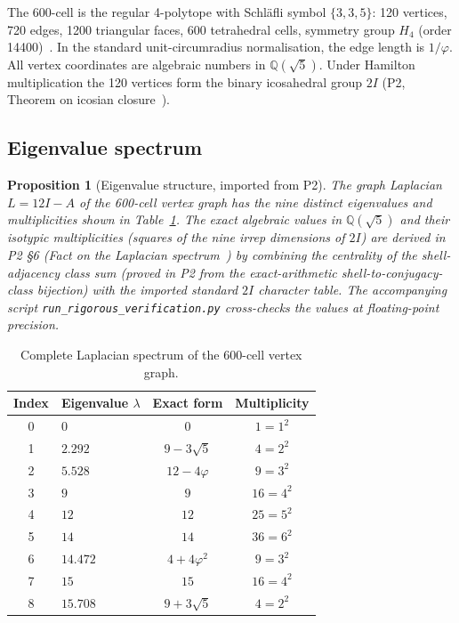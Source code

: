\documentclass[12pt]{article}
\newtheorem{proposition}[theorem]{Proposition}
\newcommand{\phig}{\varphi}
\begin{document}
The 600-cell is the regular 4-polytope with Schl\"afli symbol $\{3,3,5\}$: 120 vertices, 720 edges, 1200 triangular faces, 600 tetrahedral cells, symmetry group $H_4$ (order 14400)~\citep{Coxeter1973}. In the standard unit-circumradius normalisation, the edge length is $1/\phig$. All vertex coordinates are algebraic numbers in $\mathbb{Q}(\sqrt{5})$. Under Hamilton multiplication the 120 vertices form the binary icosahedral group $2I$ (P2, Theorem on icosian closure~\citep{CascadeAlgSubstrate}).

\subsection{Eigenvalue spectrum}

\begin{proposition}[Eigenvalue structure, imported from P2]\label{thm:eigenvalues}
The graph Laplacian $L = 12I - A$ of the 600-cell vertex graph has the nine distinct eigenvalues and multiplicities shown in Table~\ref{tab:spectrum}. The exact algebraic values in $\mathbb{Q}(\sqrt 5)$ and their isotypic multiplicities (squares of the nine irrep dimensions of $2I$) are derived in P2 \S 6 (Fact on the Laplacian spectrum~\citep{CascadeAlgSubstrate}) by combining the centrality of the shell-adjacency class sum (proved in P2 from the exact-arithmetic shell-to-conjugacy-class bijection) with the imported standard $2I$ character table. The accompanying script \texttt{run\_rigorous\_verification.py} cross-checks the values at floating-point precision.
\end{proposition}

\begin{table}[ht]
\centering
\caption{Complete Laplacian spectrum of the 600-cell vertex graph.}
\label{tab:spectrum}
\begin{tabular}{@{}clcc@{}}
\toprule
Index & Eigenvalue $\lambda$ & Exact form & Multiplicity \\
\midrule
0 & $0$ & $0$ & $1 = 1^2$ \\
1 & $2.292$ & $9 - 3\sqrt{5}$ & $4 = 2^2$ \\
2 & $5.528$ & $12 - 4\phig$ & $9 = 3^2$ \\
3 & $9$ & $9$ & $16 = 4^2$ \\
4 & $12$ & $12$ & $25 = 5^2$ \\
5 & $14$ & $14$ & $36 = 6^2$ \\
6 & $14.472$ & $4 + 4\phig^2$ & $9 = 3^2$ \\
7 & $15$ & $15$ & $16 = 4^2$ \\
8 & $15.708$ & $9 + 3\sqrt{5}$ & $4 = 2^2$ \\
\bottomrule
\end{tabular}
\end{table}
\end{document}
